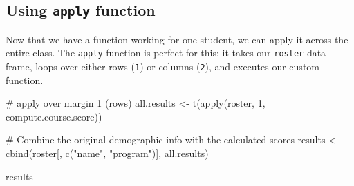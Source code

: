 \documentclass[
  letterpaper,
  DIV=11,
  numbers=noendperiod]{scrreprt}
\newenvironment{Shaded}{\begin{snugshade}}{\end{snugshade}}
\newcommand{\CommentTok}[1]{\textcolor[rgb]{0.37,0.37,0.37}{#1}}
\newcommand{\DecValTok}[1]{\textcolor[rgb]{0.68,0.00,0.00}{#1}}
\newcommand{\FunctionTok}[1]{\textcolor[rgb]{0.28,0.35,0.67}{#1}}
\newcommand{\NormalTok}[1]{\textcolor[rgb]{0.00,0.23,0.31}{#1}}
\newcommand{\OtherTok}[1]{\textcolor[rgb]{0.00,0.23,0.31}{#1}}
\newcommand{\StringTok}[1]{\textcolor[rgb]{0.13,0.47,0.30}{#1}}
\begin{document}
\subsection{\texorpdfstring{Using \texttt{apply}
function}{Using apply function}}\label{using-apply-function}

Now that we have a function working for one student, we can apply it
across the entire class. The \texttt{apply} function is perfect for
this: it takes our \texttt{roster} data frame, loops over either rows
(\texttt{1}) or columns (\texttt{2}), and executes our custom function.

\begin{Shaded}
\begin{Highlighting}[]
\CommentTok{\# apply over margin 1 (rows)}
\NormalTok{all.results }\OtherTok{\textless{}{-}} \FunctionTok{t}\NormalTok{(}\FunctionTok{apply}\NormalTok{(roster, }\DecValTok{1}\NormalTok{, compute.course.score))}

\CommentTok{\# Combine the original demographic info with the calculated scores}
\NormalTok{results }\OtherTok{\textless{}{-}} \FunctionTok{cbind}\NormalTok{(roster[, }\FunctionTok{c}\NormalTok{(}\StringTok{"name"}\NormalTok{, }\StringTok{"program"}\NormalTok{)], all.results)}

\NormalTok{results}
\end{Highlighting}
\end{Shaded}
\end{document}
